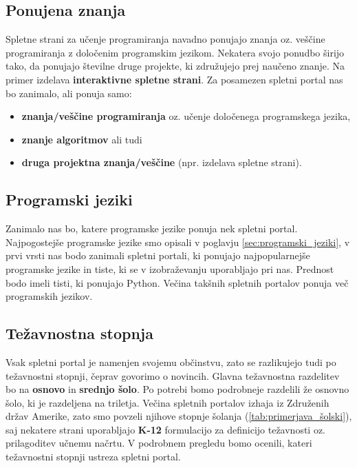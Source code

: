 \subsection{Ponujena znanja}
\label{sec:vsebina_problemsk_pristop}

Spletne strani za učenje programiranja navadno ponujajo znanja oz.
veščine programiranja z določenim programskim jezikom. Nekatera svojo
ponudbo širijo tako, da ponujajo številne druge projekte, ki
združujejo prej naučeno znanje. Na primer izdelava
\textbf{interaktivne spletne strani}. Za posamezen spletni portal nas
bo zanimalo, ali ponuja samo:

\begin{itemize}
  \tightlist
\item \textbf{znanja/veščine programiranja} oz. učenje določenega
  programskega jezika,
\item \textbf{znanje algoritmov} ali tudi
\item \textbf{druga projektna znanja/veščine} (npr. izdelava spletne
  strani).
\end{itemize}


\subsection{Programski jeziki}
\label{sec:_zanaja_programski_jeziki}

Zanimalo nas bo, katere programske jezike ponuja nek spletni
portal. Najpogostejše programske jezike smo opisali v poglavju
\ref{sec:programski_jeziki}, v prvi vrsti nas bodo zanimali spletni
portali, ki ponujajo najpopularnejše programske jezike in tiste, ki
se v izobraževanju uporabljajo pri nas. Prednost bodo imeli tisti,
ki ponujajo Python. Večina takšnih spletnih portalov ponuja več
programskih jezikov.

\subsection{Težavnostna stopnja}
\label{sec:težavnostna_stopnja}

Vsak spletni portal je namenjen svojemu občinstvu, zato se razlikujejo tudi po
težavnostni stopnji, čeprav govorimo o novincih. Glavna težavnostna razdelitev
bo na \textbf{osnovo} in \textbf{srednjo šolo}. Po potrebi bomo podrobneje
razdelili že osnovno šolo, ki je razdeljena na triletja. Večina spletnih
portalov izhaja iz Združenih držav Amerike, zato smo povzeli njihove stopnje
šolanja (\ref{tab:primerjava_šolski}), saj nekatere strani uporabljajo
\textbf{K-12} formulacijo za definicijo težavnosti oz. prilagoditev učnemu
načrtu. V podrobnem pregledu bomo ocenili, kateri težavnostni stopnji ustreza
spletni portal.

